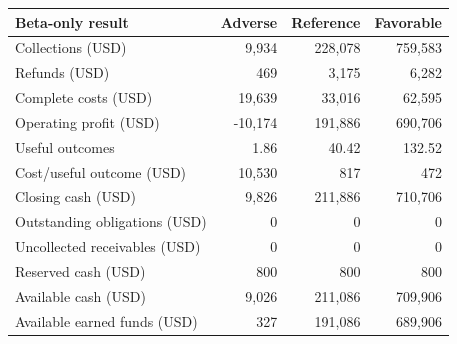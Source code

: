 \begin{tabular}{lrrr}
\toprule Beta-only result & Adverse & Reference & Favorable \\
\midrule
Collections (USD) & 9,934 & 228,078 & 759,583 \\
Refunds (USD) & 469 & 3,175 & 6,282 \\
Complete costs (USD) & 19,639 & 33,016 & 62,595 \\
Operating profit (USD) & -10,174 & 191,886 & 690,706 \\
Useful outcomes & 1.86 & 40.42 & 132.52 \\
Cost/useful outcome (USD) & 10,530 & 817 & 472 \\
Closing cash (USD) & 9,826 & 211,886 & 710,706 \\
Outstanding obligations (USD) & 0 & 0 & 0 \\
Uncollected receivables (USD) & 0 & 0 & 0 \\
Reserved cash (USD) & 800 & 800 & 800 \\
Available cash (USD) & 9,026 & 211,086 & 709,906 \\
Available earned funds (USD) & 327 & 191,086 & 689,906 \\
\bottomrule
\end{tabular}

